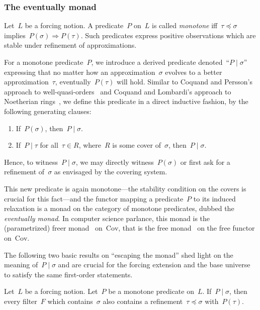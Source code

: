 \documentclass[envcountsect,envcountsame,runningheads]{llncs}
\newcommand{\Cov}{\mathrm{Cov}}
\renewcommand{\_}{\mathpunct{.}\,}
\begin{document}
\subsubsection{The eventually monad} Let~$L$ be a forcing notion. A
predicate~$P$ on~$L$ is called \emph{monotone} iff~$\tau \preceq \sigma$
implies~$P(\sigma) \Rightarrow P(\tau)$. Such predicates express positive
observations which are stable under refinement of approximations.

For a monotone predicate~$P$, we introduce a derived predicate denoted~``$P
\mid \sigma$'' expressing that no matter how an approximation~$\sigma$ evolves
to a better approximation~$\tau$, eventually~$P(\tau)$ will hold. Similar to
Coquand and Persson's approach to well-quasi-orders~\cite[Definition~6]{coquand-persson:groebner} and
Coquand and Lombardi's approach to Noetherian
rings~\cite{coquand-lombardi:krull,coquand:invariant}, we define this predicate
in a direct inductive fashion, by the following generating clauses:
\begin{enumerate}
\item If~$P(\sigma)$, then~$P \mid \sigma$.
\item If~$P \mid \tau$ for all~$\tau \in R$, where~$R$ is some cover
of~$\sigma$, then~$P \mid \sigma$.
\end{enumerate}
Hence, to witness~$P \mid \sigma$, we may directly witness~$P(\sigma)$ or first
ask for a refinement of~$\sigma$ as envisaged by the covering system.

This new predicate is again monotone---the stability condition on the covers is
crucial for this fact---and the functor mapping a predicate~$P$ to its induced
relaxation is a monad on the category of monotone predicates, dubbed the
\emph{eventually monad}. In computer science parlance, this monad is
the (parametrized) freer monad~\cite{kiselyov-ishii:freer,apfelmus:operational}
on~$\Cov$, that is the free monad~\cite[Section~6]{swierstra:carte}
on the free functor on~$\Cov$.

The following two basic results on ``escaping the monad'' shed light on the
meaning of~$P \mid \sigma$ and are crucial for the forcing extension and the
base universe to satisfy the same first-order statements.

\begin{proposition}\label{prop:ev-points}Let~$L$ be a forcing notion. Let~$P$
be a monotone predicate on~$L$. If~$P \mid \sigma$, then every filter~$F$ which
contains~$\sigma$ also contains a refinement~$\tau \preceq \sigma$
with~$P(\tau)$.
\end{proposition}
\end{document}
